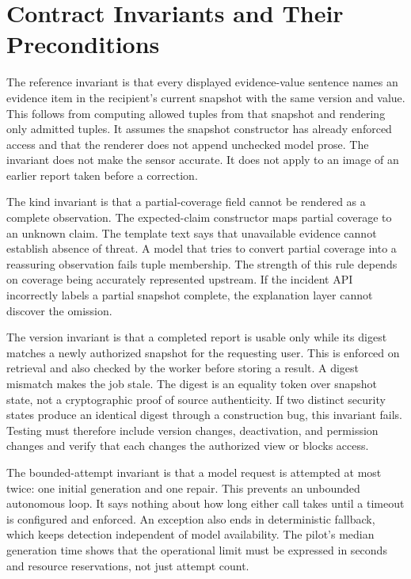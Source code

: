 \documentclass[conference,letterpaper]{IEEEtran}
\begin{document}
\section{Contract Invariants and Their Preconditions}
The reference invariant is that every displayed evidence-value sentence names an evidence item in the recipient's current snapshot with the same version and value. This follows from computing allowed tuples from that snapshot and rendering only admitted tuples. It assumes the snapshot constructor has already enforced access and that the renderer does not append unchecked model prose. The invariant does not make the sensor accurate. It does not apply to an image of an earlier report taken before a correction.

The kind invariant is that a partial-coverage field cannot be rendered as a complete observation. The expected-claim constructor maps partial coverage to an unknown claim. The template text says that unavailable evidence cannot establish absence of threat. A model that tries to convert partial coverage into a reassuring observation fails tuple membership. The strength of this rule depends on coverage being accurately represented upstream. If the incident API incorrectly labels a partial snapshot complete, the explanation layer cannot discover the omission.

The version invariant is that a completed report is usable only while its digest matches a newly authorized snapshot for the requesting user. This is enforced on retrieval and also checked by the worker before storing a result. A digest mismatch makes the job stale. The digest is an equality token over snapshot state, not a cryptographic proof of source authenticity. If two distinct security states produce an identical digest through a construction bug, this invariant fails. Testing must therefore include version changes, deactivation, and permission changes and verify that each changes the authorized view or blocks access.

The bounded-attempt invariant is that a model request is attempted at most twice: one initial generation and one repair. This prevents an unbounded autonomous loop. It says nothing about how long either call takes until a timeout is configured and enforced. An exception also ends in deterministic fallback, which keeps detection independent of model availability. The pilot's median generation time shows that the operational limit must be expressed in seconds and resource reservations, not just attempt count.
\end{document}
